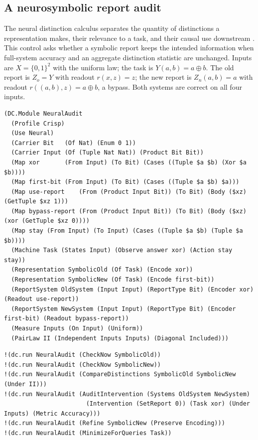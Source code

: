 \documentclass[11pt]{article}
\theoremstyle{definition}
\theoremstyle{plain}
\begin{document}
\subsection{A neurosymbolic report audit}\label{sec:neural}

The neural distinction calculus separates the quantity of distinctions a representation makes, their
relevance to a task, and their causal use downstream \cite{neuraldc}. This control asks whether a
symbolic report keeps the intended information when full-system accuracy and an aggregate distinction
statistic are unchanged. Inputs are $X=\{0,1\}^2$ with the uniform law; the task is $Y(a,b)=a\oplus b$.
The old report is $Z_o=Y$ with readout $r(x,z)=z$; the new report is $Z_n(a,b)=a$ with readout
$r((a,b),z)=a\oplus b$, a bypass. Both systems are correct on all four inputs.

\begin{lstlisting}[basicstyle=\ttfamily\footnotesize,title={\scriptsize\ttfamily fixtures/neural\_audit.metta}]
(DC.Module NeuralAudit
  (Profile Crisp)
  (Use Neural)
  (Carrier Bit   (Of Nat) (Enum 0 1))
  (Carrier Input (Of (Tuple Nat Nat)) (Product Bit Bit))
  (Map xor       (From Input) (To Bit) (Cases ((Tuple $a $b) (Xor $a $b))))
  (Map first-bit (From Input) (To Bit) (Cases ((Tuple $a $b) $a)))
  (Map use-report    (From (Product Input Bit)) (To Bit) (Body ($xz) (GetTuple $xz 1)))
  (Map bypass-report (From (Product Input Bit)) (To Bit) (Body ($xz) (xor (GetTuple $xz 0))))
  (Map stay (From Input) (To Input) (Cases ((Tuple $a $b) (Tuple $a $b))))
  (Machine Task (States Input) (Observe answer xor) (Action stay stay))
  (Representation SymbolicOld (Of Task) (Encode xor))
  (Representation SymbolicNew (Of Task) (Encode first-bit))
  (ReportSystem OldSystem (Input Input) (ReportType Bit) (Encoder xor) (Readout use-report))
  (ReportSystem NewSystem (Input Input) (ReportType Bit) (Encoder first-bit) (Readout bypass-report))
  (Measure Inputs (On Input) (Uniform))
  (PairLaw II (Independent Inputs Inputs) (Diagonal Included)))
\end{lstlisting}
\begin{lstlisting}[basicstyle=\ttfamily\footnotesize,title={\scriptsize\ttfamily fixtures/neural\_audit.metta}]
!(dc.run NeuralAudit (CheckNow SymbolicOld))
!(dc.run NeuralAudit (CheckNow SymbolicNew))
!(dc.run NeuralAudit (CompareDistinctions SymbolicOld SymbolicNew (Under II)))
!(dc.run NeuralAudit (AuditIntervention (Systems OldSystem NewSystem)
                       (Intervention (SetReport 0)) (Task xor) (Under Inputs) (Metric Accuracy)))
!(dc.run NeuralAudit (Refine SymbolicNew (Preserve Encoding)))
!(dc.run NeuralAudit (MinimizeForQueries Task))
\end{lstlisting}
\end{document}

